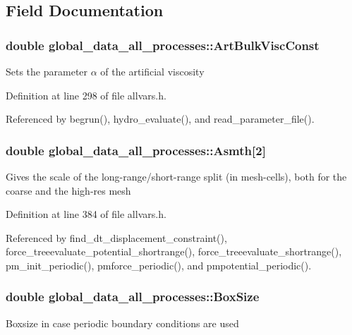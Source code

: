 \subsection{Field Documentation}
\hypertarget{structglobal__data__all__processes_a14b9df6a6579d2ce6ef7c86aa0230217}{
\subsubsection[{ArtBulkViscConst}]{\setlength{\rightskip}{0pt plus 5cm}double {\bf global\_\-data\_\-all\_\-processes::ArtBulkViscConst}}}
\label{structglobal__data__all__processes_a14b9df6a6579d2ce6ef7c86aa0230217}
Sets the parameter $\alpha$ of the artificial viscosity 

Definition at line 298 of file allvars.h.



Referenced by begrun(), hydro\_\-evaluate(), and read\_\-parameter\_\-file().

\hypertarget{structglobal__data__all__processes_a3bf3f2dd9be45f8f203424e57b9d9de3}{
\subsubsection[{Asmth}]{\setlength{\rightskip}{0pt plus 5cm}double {\bf global\_\-data\_\-all\_\-processes::Asmth}\mbox{[}2\mbox{]}}}
\label{structglobal__data__all__processes_a3bf3f2dd9be45f8f203424e57b9d9de3}
Gives the scale of the long-\/range/short-\/range split (in mesh-\/cells), both for the coarse and the high-\/res mesh 

Definition at line 384 of file allvars.h.



Referenced by find\_\-dt\_\-displacement\_\-constraint(), force\_\-treeevaluate\_\-potential\_\-shortrange(), force\_\-treeevaluate\_\-shortrange(), pm\_\-init\_\-periodic(), pmforce\_\-periodic(), and pmpotential\_\-periodic().

\hypertarget{structglobal__data__all__processes_ac1b2e52cf547f5b2fe4bdfb0eaafa22f}{
\subsubsection[{BoxSize}]{\setlength{\rightskip}{0pt plus 5cm}double {\bf global\_\-data\_\-all\_\-processes::BoxSize}}}
\label{structglobal__data__all__processes_ac1b2e52cf547f5b2fe4bdfb0eaafa22f}
Boxsize in case periodic boundary conditions are used 

